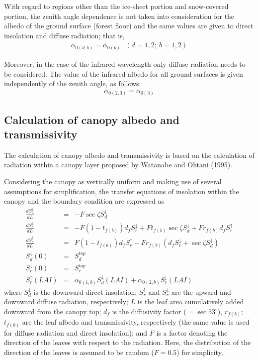 With regard to regions other than the ice-sheet portion and snow-covered portion, the zenith angle dependence is not taken into consideration for the albedo of the ground surface (forest floor) and
the same values are given to direct insolation and diffuse radiation; that is, \begin{eqnarray}
 \alpha_{0(d,b)} = \alpha_{0(b)}\ \ \ (d=1,2;\ b=1,2)
\end{eqnarray}

Moreover, in the case of the infrared wavelength only diffuse radiation needs to be considered. The value of the infrared albedo for all ground surfaces is given independently of the zenith angle, as
follows: \begin{eqnarray}
 \alpha_{0(2,3)} = \alpha_{0(3)}
\end{eqnarray}

\hypertarget{calculation-of-canopy-albedo-and-transmissivity}{%
\subsection{Calculation of canopy albedo and transmissivity}\label{calculation-of-canopy-albedo-and-transmissivity}}

The calculation of canopy albedo and transmissivity is based on the calculation of radiation within a canopy layer proposed by Watanabe and Ohtani (1995).

Considering the canopy as vertically uniform and making use of several assumptions for simplification, the transfer equations of insolation within the canopy and the boundary condition are expressed
as \begin{eqnarray}
 \frac{dS^{\downarrow}_d}{dL} &=& -F \sec\zeta S^{\downarrow}_d \\
 \frac{dS^{\downarrow}_r}{dL} &=& -F (1-t_{f(b)})d_f S^{\downarrow}_r
                                  +F t_{f(b)} \sec\zeta S^{\downarrow}_d
                                  +F r_{f(b)} d_f S^{\uparrow}_r \\
 \frac{dS^{\uparrow}_r}{dL}   &=&  F (1-t_{f(b)})d_f S^{\uparrow}_r
                                  -F r_{f(b)} ( d_f S^{\downarrow}_r
                                         + \sec\zeta S^{\downarrow}_d ) \\
 S^{\downarrow}_d(0) &=& S^{top}_d \\
 S^{\downarrow}_r(0) &=& S^{top}_r \\
 S^{\uparrow}_r(LAI) &=& \alpha_{0(1,b)}S^{\downarrow}_d(LAI)
                       + \alpha_{0(2,b)}S^{\downarrow}_r(LAI)
\end{eqnarray} where \(S^{\downarrow}_d\) is the downward direct insolation; \(S^{\uparrow}_r\) and \(S^{\downarrow}_r\) are the upward and downward diffuse radiation, respectively; \(L\) is the leaf area
cumulatively added downward from the canopy top; \(d_f\) is the diffusivity factor (\(=\sec 53^{\circ}\)), \(r_{f(b)}\); \(t_{f(b)}\) are the leaf albedo and transmissivity, respectively (the same
value is used for diffuse radiation and direct insolation); and \(F\) is a factor denoting the direction of the leaves with respect to the radiation. Here, the distribution of the direction of the
leaves is assumed to be random (\(F=0.5\)) for simplicity.


